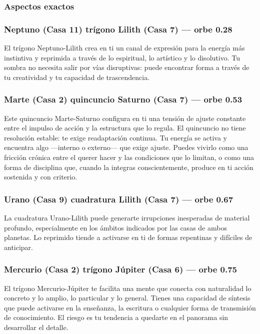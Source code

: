 \documentclass[11pt,a4paper]{article}
\begin{document}
\subsubsection*{Aspectos exactos}
\subsubsection*{Neptuno (Casa 11) trígono Lilith (Casa 7) --- orbe 0.28\textdegree}
El trígono Neptuno-Lilith crea en ti un canal de expresión para la energía más instintiva y reprimida a través de lo espiritual, lo artístico y lo disolutivo. Tu sombra no necesita salir por vías disruptivas: puede encontrar forma a través de tu creatividad y tu capacidad de trascendencia.

\subsubsection*{Marte (Casa 2) quincuncio Saturno (Casa 7) --- orbe 0.53\textdegree}
Este quincuncio Marte-Saturno configura en ti una tensión de ajuste constante entre el impulso de acción y la estructura que lo regula. El quincuncio no tiene resolución estable: te exige readaptación continua. Tu energía se activa y encuentra algo —interno o externo— que exige ajuste. Puedes vivirlo como una fricción crónica entre el querer hacer y las condiciones que lo limitan, o como una forma de disciplina que, cuando la integras conscientemente, produce en ti acción sostenida y con criterio.

\subsubsection*{Urano (Casa 9) cuadratura Lilith (Casa 7) --- orbe 0.67\textdegree}
La cuadratura Urano-Lilith puede generarte irrupciones inesperadas de material profundo, especialmente en los ámbitos indicados por las casas de ambos planetas. Lo reprimido tiende a activarse en ti de formas repentinas y difíciles de anticipar.

\subsubsection*{Mercurio (Casa 2) trígono Júpiter (Casa 6) --- orbe 0.75\textdegree}
El trígono Mercurio-Júpiter te facilita una mente que conecta con naturalidad lo concreto y lo amplio, lo particular y lo general. Tienes una capacidad de síntesis que puede activarse en la enseñanza, la escritura o cualquier forma de transmisión de conocimiento. El riesgo es tu tendencia a quedarte en el panorama sin desarrollar el detalle.
\end{document}
